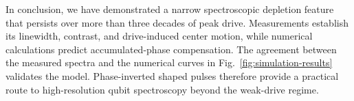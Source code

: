 \par
In conclusion, we have demonstrated a narrow spectroscopic depletion feature
that persists over more than three decades of peak drive. Measurements
establish its linewidth, contrast, and drive-induced center motion, while
numerical calculations predict accumulated-phase compensation. The agreement between the measured spectra
and the numerical curves in Fig.~\ref{fig:simulation-results} validates the
model. Phase-inverted shaped pulses therefore provide a practical route
to high-resolution qubit spectroscopy beyond the weak-drive regime.
